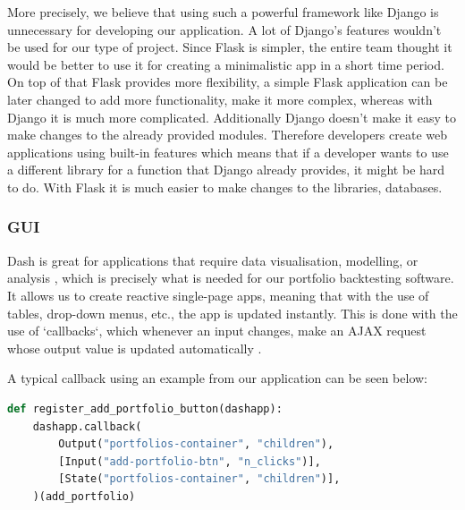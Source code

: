 More precisely, we believe that using such a powerful framework like Django is unnecessary for developing our application. A lot of Django's features wouldn't be used for our type of project. Since Flask is simpler, the entire team thought it would be better to use it for creating a minimalistic app in a short time period. On top of that Flask provides more flexibility, a simple Flask application can be later changed to add more functionality, make it more complex, whereas with Django it is much more complicated. Additionally Django doesn't make it easy to make changes to the already provided modules. Therefore developers create web applications using built-in features which means that if a developer wants to use a different library for a function that Django already provides, it might be hard to do. With Flask it is much easier to make changes to the libraries, databases. 

\subsubsection{GUI}
\label{GUI}

Dash is great for applications that require data visualisation, modelling, or analysis \cite{dash}, which is precisely what is needed for our portfolio backtesting software. It allows us to create reactive single-page apps, meaning that with the use of tables, drop-down menus, etc., the app is updated instantly. This is done with the use of `callbacks`, which whenever an input changes, make an AJAX request whose output value is updated automatically \cite{callbacks}.

A typical callback using an example from our application can be seen below:

\begin{lstlisting}[language=Python, caption=setup.py - Development environment, label=lst:callback_example]
def register_add_portfolio_button(dashapp):
    dashapp.callback(
        Output("portfolios-container", "children"),
        [Input("add-portfolio-btn", "n_clicks")],
        [State("portfolios-container", "children")],
    )(add_portfolio)
\end{lstlisting}

